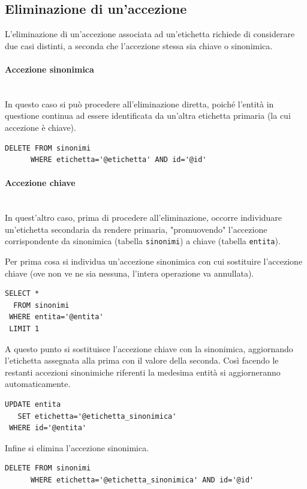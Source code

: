 \documentclass[10pt,a4paper,headinclude,footinclude,hidelinks]{scrreprt} %
\begin{document}
	\subsection{Eliminazione di un'accezione}
	\label{ch:stage:er:operazioni:accezioni:eliminazione}
	L'eliminazione di un'accezione associata ad un'etichetta richiede di considerare due casi distinti, a seconda che l'accezione stessa sia chiave o sinonimica.

	\paragraph{Accezione sinonimica} \hfill \\
	In questo caso si può procedere all'eliminazione diretta, poiché l'entità in questione continua ad essere identificata da un'altra etichetta primaria (la cui accezione è chiave).
\begin{verbatim}
DELETE FROM sinonimi
      WHERE etichetta='@etichetta' AND id='@id'
\end{verbatim}

	\paragraph{Accezione chiave} \hfill \\
	In quest'altro caso, prima di procedere all'eliminazione, occorre individuare un'etichetta secondaria da rendere primaria, "promuovendo" l'accezione corrispondente da sinonimica (tabella \texttt{sinonimi}) a chiave (tabella \texttt{entita}).

	Per prima cosa si individua un'accezione sinonimica con cui sostituire l'accezione chiave (ove non ve ne sia nessuna, l'intera operazione va annullata).
\begin{verbatim}
SELECT *
  FROM sinonimi
 WHERE entita='@entita'
 LIMIT 1
\end{verbatim}

	A questo punto si sostituisce l'accezione chiave con la sinonimica, aggiornando l'etichetta assegnata alla prima con il valore della seconda. Così facendo le restanti accezioni sinonimiche riferenti la medesima entità si aggiorneranno automaticamente.
\begin{verbatim}
UPDATE entita
   SET etichetta='@etichetta_sinonimica'
 WHERE id='@entita'
\end{verbatim} 

	Infine si elimina l'accezione sinonimica.
\begin{verbatim}
DELETE FROM sinonimi
      WHERE etichetta='@etichetta_sinonimica' AND id='@id'
\end{verbatim}
\end{document}
